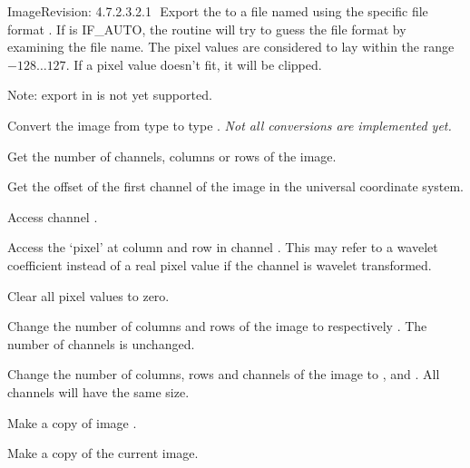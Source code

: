\begin{manpage}{\libtitle}{Image}{$ $Revision: 4.7.2.3.2.1 $ $}
    Export the to a file named  using the specific file format
    . If  is IF\_AUTO, the routine will try to guess
    the file format by examining the file name. The pixel values are considered
    to lay within the range $-128 \ldots 127$. If a pixel value doesn't fit, it
    will be clipped.

    Note: export in  is not yet supported.

    Convert the image from type  to type .
    \emph{Not all conversions are implemented yet.}

    Get the number of channels, columns or rows of the image.

    Get the offset of the first channel of the image in the universal
    coordinate system.

    Access channel .

    Access the `pixel' at column  and row  in channel
    \name{ch}. This may refer to a wavelet coefficient instead of a real pixel
    value if the channel is wavelet transformed.

    Clear all pixel values to zero.

    Change the number of columns and rows of the image to 
    respectively \name{rows}. The number of channels is unchanged.

    Change the number of columns, rows and channels of the image to
    \name{cols}, \name{rows} and \name{channels}. All channels will have the
    same size.

    Make a copy of image .

    Make a copy of the current image.


\end{manpage}
